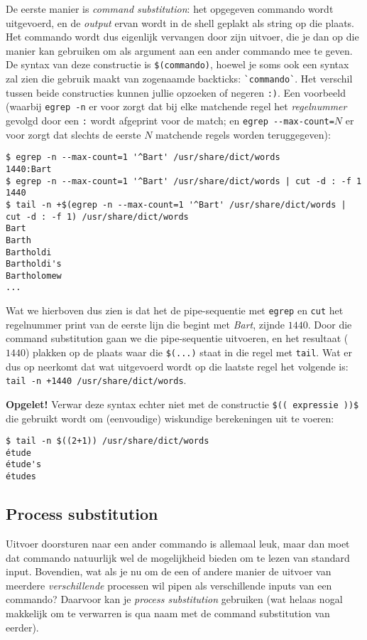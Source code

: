 \documentclass[a4paper,twoside,openany]{memoir}
\begin{document}
De eerste manier is \emph{command substitution}: het opgegeven commando wordt
uitgevoerd, en de \emph{output} ervan wordt in de shell geplakt als string op
die plaats. Het commando wordt dus eigenlijk vervangen door zijn uitvoer, die
je dan op die manier kan gebruiken om als argument aan een ander commando mee
te geven. De syntax van deze constructie is \verb!$(commando)!, hoewel je soms
ook een syntax zal zien die gebruik maakt van zogenaamde backticks:
\verb!`commando`!. Het verschil tussen beide constructies kunnen jullie
opzoeken of negeren \verb!:)!. Een voorbeeld (waarbij \verb!egrep -n! er voor
zorgt dat bij elke matchende regel het \emph{regelnummer} gevolgd door een
\verb!:! wordt afgeprint voor de match; en \verb!egrep --max-count=!$N$ er voor
zorgt dat slechts de eerste $N$ matchende regels worden teruggegeven):

\begin{verbatim}
$ egrep -n --max-count=1 '^Bart' /usr/share/dict/words
1440:Bart
$ egrep -n --max-count=1 '^Bart' /usr/share/dict/words | cut -d : -f 1
1440
$ tail -n +$(egrep -n --max-count=1 '^Bart' /usr/share/dict/words | cut -d : -f 1) /usr/share/dict/words
Bart
Barth
Bartholdi
Bartholdi's
Bartholomew
...
\end{verbatim}

Wat we hierboven dus zien is dat het de pipe-sequentie met \verb!egrep! en
\verb!cut! het regelnummer print van de eerste lijn die begint met \emph{Bart},
zijnde $1440$. Door die command substitution gaan we die pipe-sequentie
uitvoeren, en het resultaat ($1440$) plakken op de plaats waar die
\verb!$(...)! staat in die regel met \verb!tail!. Wat er dus op neerkomt dat
wat uitgevoerd wordt op die laatste regel het volgende is: \verb!tail -n +1440 /usr/share/dict/words!.

\textbf{Opgelet!} Verwar deze syntax echter niet met de constructie \verb!$(( expressie ))$! die gebruikt wordt om (eenvoudige) wiskundige berekeningen uit te voeren:
\begin{verbatim}
$ tail -n $((2+1)) /usr/share/dict/words
étude
étude's
études
\end{verbatim}

\subsection{Process substitution}

Uitvoer doorsturen naar een ander commando is allemaal leuk, maar dan moet dat
commando natuurlijk wel de mogelijkheid bieden om te lezen van standard input.
Bovendien, wat als je nu om de een of andere manier de uitvoer van meerdere
\emph{verschillende} processen wil pipen als verschillende inputs van een
commando? Daarvoor kan je \emph{process substitution} gebruiken (wat helaas
nogal makkelijk om te verwarren is qua naam met de command substitution van
eerder).
\end{document}
